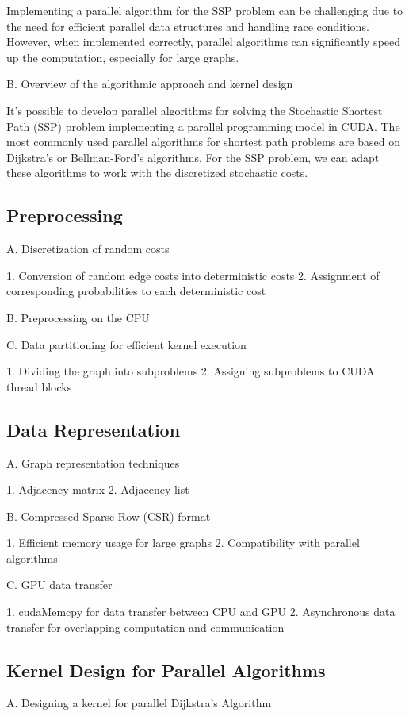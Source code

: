\documentclass{article}
\begin{document}
Implementing a parallel algorithm for the SSP problem can be challenging due to the need for efficient 
parallel data structures and handling race conditions. However, when implemented correctly, parallel algorithms 
can significantly speed up the computation, especially for large graphs.

B. Overview of the algorithmic approach and kernel design

It's possible to develop parallel 
algorithms for solving the Stochastic Shortest Path (SSP) problem implementing a parallel programming model in 
CUDA. The most commonly used parallel algorithms for shortest path problems are based on Dijkstra's or Bellman-Ford's 
algorithms. For the SSP problem, we can adapt these algorithms to work with the discretized stochastic costs.

\subsection{Preprocessing}
A. Discretization of random costs

1. Conversion of random edge costs into deterministic costs
2. Assignment of corresponding probabilities to each deterministic cost

B. Preprocessing on the CPU

C. Data partitioning for efficient kernel execution

1. Dividing the graph into subproblems
2. Assigning subproblems to CUDA thread blocks

\subsection{Data Representation}
A. Graph representation techniques

1. Adjacency matrix
2. Adjacency list

B. Compressed Sparse Row (CSR) format

1. Efficient memory usage for large graphs
2. Compatibility with parallel algorithms

C. GPU data transfer

1. cudaMemcpy for data transfer between CPU and GPU
2. Asynchronous data transfer for overlapping computation and communication

\subsection{Kernel Design for Parallel Algorithms}
A. Designing a kernel for parallel Dijkstra's Algorithm
\end{document}
